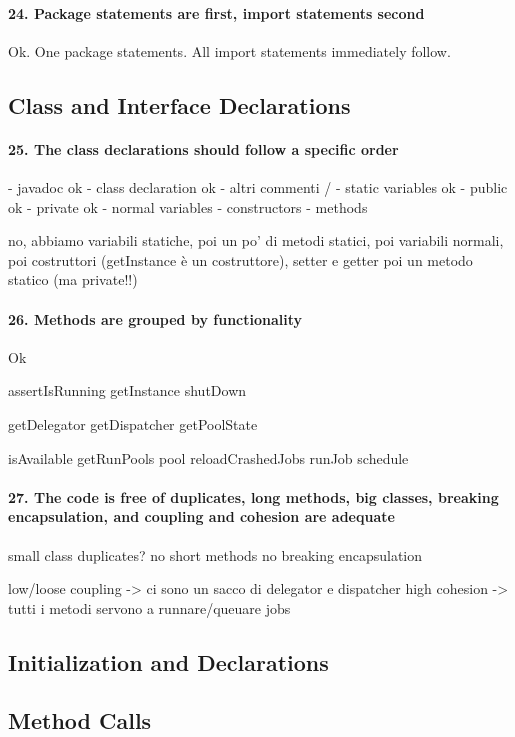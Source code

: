 \documentclass[english]{article}
\begin{document}
\paragraph{24. Package statements are first, import statements second}
Ok.
One package statements.
All import statements immediately follow.

\subsection{Class and Interface Declarations}
\paragraph{25. The class declarations should follow a specific order}
- javadoc ok
- class declaration ok
- altri commenti /
- static variables ok
 - public ok
 - private ok
- normal variables 
- constructors
- methods

no, abbiamo variabili statiche, poi un po' di metodi statici, poi variabili normali, poi costruttori (getInstance è un costruttore), setter e getter poi un metodo statico (ma private!!)


\paragraph{26. Methods are grouped by functionality}
Ok

assertIsRunning
getInstance
shutDown

getDelegator
getDispatcher
getPoolState

isAvailable
getRunPools
pool
reloadCrashedJobs
runJob
schedule

\paragraph{27. The code is free of duplicates, long methods, big classes, breaking encapsulation, and coupling and cohesion are adequate}
small class
duplicates? no
short methods
no breaking encapsulation

low/loose coupling -> ci sono un sacco di delegator e dispatcher
high cohesion -> tutti i metodi servono a runnare/queuare jobs

\subsection{Initialization and Declarations}


\subsection{Method Calls}
\end{document}
